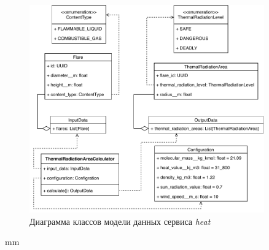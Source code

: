 \begin{figure}[H]
	\includegraphics[width=0.9\textwidth]{implementation/pictures/math/classes}
	\caption{Диаграмма классов модели данных сервиса \textit{heat}}
	\label{pic:implementation__math-classes}
\end{figure}
 mm
